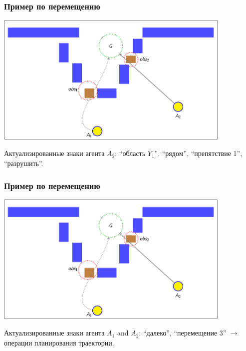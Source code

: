 \documentclass[default]{beamer}
\begin{document}
	\begin{frame}
		\frametitle{Пример по перемещению}
		
		\begin{center}
			\includegraphics[page=95,width=0.85\textwidth]{examples/slides_colored}
		\end{center}
		\par\bigskip
		Актуализированные знаки агента $A_2$: ``область $Y_1$'', ``рядом'', ``препятствие 1'', ``разрушить''.
	\end{frame}
	
	\begin{frame}
		\frametitle{Пример по перемещению}
		
		\begin{center}
			\includegraphics[page=116,width=0.85\textwidth]{examples/slides_colored}
		\end{center}
		\par\bigskip
		Актуализированные знаки агента $A_1$ and $A_2$: ``далеко'', ``перемещение 3'' $\rightarrow$ \color{red} операции планирования траектории.
	\end{frame}
	
\end{document}
